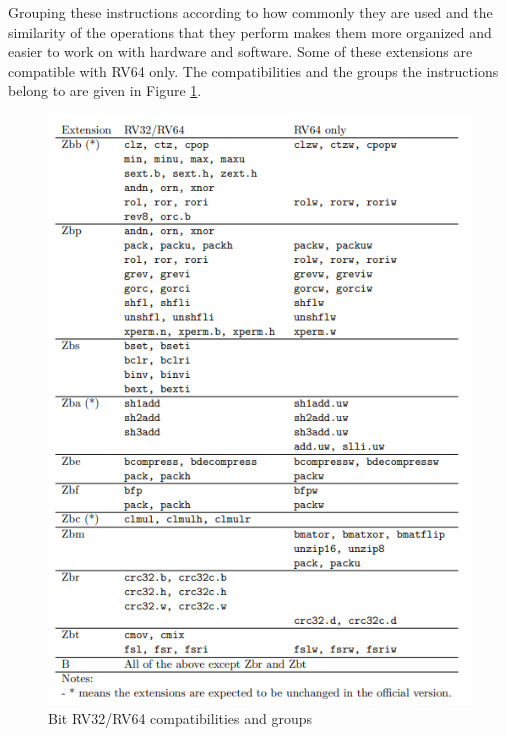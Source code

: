 Grouping these instructions according to how commonly they are used and the similarity of the operations that they perform makes them more organized and easier to work on with hardware and software. 
Some of these extensions are compatible with RV64 only. The compatibilities and the groups the instructions belong to are given in Figure \ref{fig:rv32_rv64_compatibilities_and_groups}.
\begin{figure}[h!]
    \centering
    \includegraphics{riscv/rv32_rv64_compatibilities_and_groups.png}
    \caption{Bit RV32/RV64 compatibilities and groups \cite{bitmanipdraft}}
    \label{fig:rv32_rv64_compatibilities_and_groups}
\end{figure}

\clearpage

